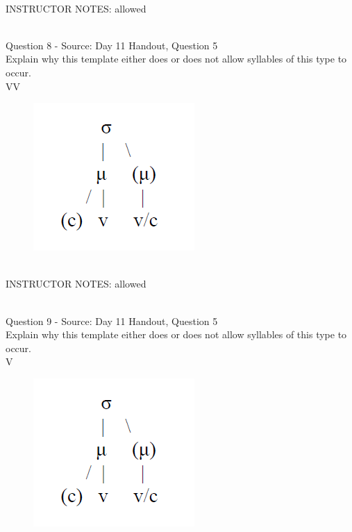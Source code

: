 \documentclass[12pt]{article}
\begin{document}
~\\
INSTRUCTOR NOTES: allowed


~\\

{\large Question 8} - Source: Day 11 Handout, Question 5\\

Explain why this template either does or does not allow syllables of this type to occur.\\

VV

\begin{figure}[H]
\includegraphics{../images/ponapean_syllabletemplate.png}
\end{figure}

~\\
INSTRUCTOR NOTES: allowed


~\\

{\large Question 9} - Source: Day 11 Handout, Question 5\\

Explain why this template either does or does not allow syllables of this type to occur.\\

V

\begin{figure}[H]
\includegraphics{../images/ponapean_syllabletemplate.png}
\end{figure}
\end{document}
